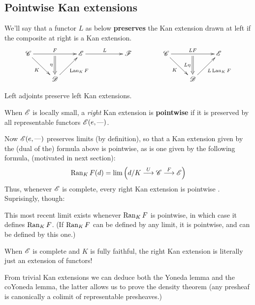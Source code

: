 \documentclass[11pt]{article}
\begin{document}
\begin{1. Kan Extensions}
\subsection*{Pointwise Kan extensions}
We'll say that a functor $L$ as below \textbf{preserves} the Kan extension drawn at left if the composite at right is a Kan extension.
\[
\vcenter{\xymatrix{
\scrC\ar[rd]_-{K}\ar[rr]^-{F}_-{}="arF"&%
&%
\scrE\ar[rr]^L&&\scrF\\%
&%
\scrD\ar@{->}[ur]_{\Lan_KF}\ar@{=>}"arF";[]_-{\eta}&%
}}
\qquad \qquad 
\vcenter{\xymatrix{
\scrC\ar[rd]_-{K}\ar[rr]^-{LF}_-{}="arF"&%
&%
\scrE\\%
&%
\scrD\ar@{->}[ur]_{L\Lan_KF}\ar@{=>}"arF";[]_-{L\eta}&%
}}
\]
\begin{lem*}
Left adjoints preserve left Kan extensions.
\end{lem*}
\begin{defn*}
When $\mathscr{E}$ is locally small, a \textit{right} Kan extension is \textbf{pointwise} if it is preserved by all representable functors $\mathscr{E}(e,\textup{---} )$.
\end{defn*}
Now $\mathscr{E}(e,\textup{---} )$ preserves limits (by definition), so that a Kan extension given by the (dual of the) formula above is pointwise, as is one given by the following formula, (motivated in next section):
\[\operatorname{Ran}_KF(d)=\lim\left(d/K\overset{U}{\longrightarrow}\mathscr{C}\overset{F}{\longrightarrow}\mathscr{E}\right)\]
Thus, whenever $\mathscr{E}$ is complete, every right Kan extension is pointwise .
Suprisingly, though:
\begin{thm*}
This most recent limit exists whenever $\operatorname{Ran}_KF$ is pointwise, in which case it defines $\operatorname{Ran}_KF$. (If $\operatorname{Ran}_KF$ can be defined by any limit, it is pointwise, and can be defined by this one.)
\end{thm*}
\begin{thm*}
When $\mathscr{E}$ is complete and $K$ is fully faithful, the right Kan extension is literally just an extension of functors!
\end{thm*}
From trivial Kan extensions we can deduce both the Yoneda lemma and the coYoneda lemma, the latter allows us to prove the density theorem (any presheaf is canonically a colimit of representable presheaves.)

\end{1. Kan Extensions}
\end{document}

